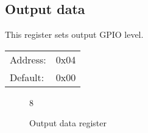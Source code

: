 \documentclass{article}
\begin{document}
		
	\subsection{Output data}
		
		This register sets output GPIO level.
		
		\begin{tabular}{ l c }
			Address: & 0x04 \\
			Default: & 0x00 \\
		\end{tabular}
		
		\begin{figure}[H]
			\centering
			\begin{bytefield}[
				bitwidth=0.1\linewidth]{8}
				 \\
			\end{bytefield}
			\caption{Output data register}
			\label{reg:output_value}
		\end{figure}
		
\end{document}
